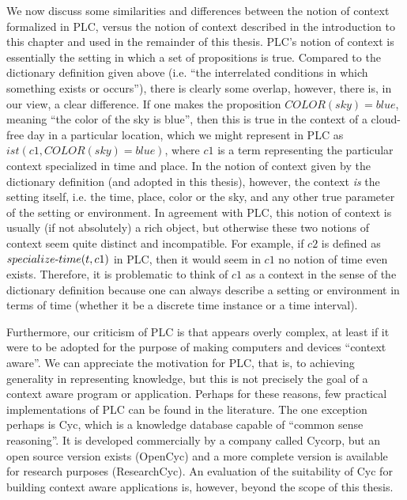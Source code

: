We now discuss some similarities and differences between the notion of context formalized in PLC, versus the notion of context described in the introduction to this chapter and used in the remainder of this thesis. PLC's notion of context is essentially the setting in which a set of propositions is true. Compared to the dictionary definition given above (i.e. ``the interrelated conditions in which something exists or occurs''), there is clearly some overlap, however, there is, in our view, a clear difference. If one makes the proposition $COLOR(sky) = blue$, meaning ``the color of the sky is blue'', then this is true in the context of a cloud-free day in a particular location, which we might represent in PLC as $ist(c1, COLOR(sky) = blue)$, where $c1$ is a term representing the particular context specialized in time and place. In the notion of context given by the dictionary definition (and adopted in this thesis), however, the context \emph{is} the setting itself, i.e. the time, place, color or the sky, and any other true parameter of the setting or environment. In agreement with PLC, this notion of context is usually (if not absolutely) a rich object, but otherwise these two notions of context seem quite distinct and incompatible. For example, if $c2$ is defined as $specialize\textnormal{-}time(t, c1)$ in PLC, then it would seem in $c1$ no notion of time even exists. Therefore, it is problematic to think of $c1$ as a context in the sense of the dictionary definition because one can always describe a setting or environment in terms of time (whether it be a discrete time instance or a time interval).

Furthermore, our criticism of PLC is that appears overly complex, at least if it were to be adopted for the purpose of making computers and devices ``context aware''. We can appreciate the motivation for PLC, that is, to achieving generality in representing knowledge, but this is not precisely the goal of a context aware program or application. Perhaps for these reasons, few practical implementations of PLC can be found in the literature. The one exception perhaps is Cyc, which is a knowledge database capable of ``common sense reasoning''. It is developed commercially by a company called Cycorp, but an open source version exists (OpenCyc) and a more complete version is available for research purposes (ResearchCyc). An evaluation of the suitability of Cyc for building context aware applications is, however, beyond the scope of this thesis.

